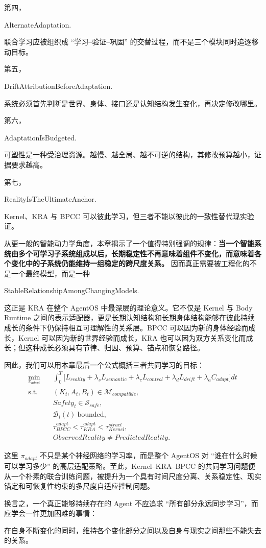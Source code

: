 第四，
\begin{statementbox}
AlternateAdaptation.
\end{statementbox}
联合学习应被组织成 ``学习--验证--巩固'' 的交替过程，而不是三个模块同时追逐移动目标。

第五，
\begin{statementbox}
DriftAttributionBeforeAdaptation.
\end{statementbox}
系统必须首先判断是世界、身体、接口还是认知结构发生变化，再决定修改哪里。

第六，
\begin{statementbox}
AdaptationIsBudgeted.
\end{statementbox}
可塑性是一种受治理资源。越慢、越全局、越不可逆的结构，其修改预算越小，证据要求越高。

第七，
\begin{statementbox}
RealityIsTheUltimateAnchor.
\end{statementbox}
Kernel、KRA 与 BPCC 可以彼此学习，但三者不能以彼此的一致性替代现实验证。

从更一般的智能动力学角度，本章揭示了一个值得特别强调的规律：\textbf{当一个智能系统由多个可学习子系统组成以后，长期稳定性不再意味着组件不变化，而意味着各个变化中的子系统仍能维持一组稳定的跨尺度关系。} 因而真正需要被工程化的不是一个最终模型，而是一种
\begin{statementbox}
StableRelationshipAmongChangingModels.
\end{statementbox}

这正是 KRA 在整个 AgentOS 中最深层的理论意义。它不仅是 Kernel 与 Body Runtime 之间的表示适配器，更是长期认知结构和长期身体结构能够在彼此持续成长的条件下仍保持相互可理解性的关系层。BPCC 可以因为新的身体经验而成长，Kernel 可以因为新的世界经验而成长，KRA 也可以因为双方关系变化而成长；但这种成长必须具有节律、归因、预算、锚点和恢复路径。

因此，我们可以用本章最后一个公式概括三者共同学习的目标：
\[
\boxed{
\begin{aligned}
\min_{\pi_{adapt}}
\quad&
\int_{0}^{T}
\Big[
L_{reality}
+
\lambda_s L_{semantic}
+
\lambda_c L_{control}
+
\lambda_d L_{drift}
+
\lambda_a C_{adapt}
\Big]dt
\\
\text{s.t.}\quad&
(K_t,A_t,B_t)\in\mathcal M_{compatible},
\\
&
Safety_t\in\mathcal S_{safe},
\\
&
\mathcal B_i(t)\ \text{bounded},
\\
&
\tau_{BPCC}^{adapt}
<
\tau_{KRA}^{adapt}
<
\tau_{Kernel}^{struct},
\\
&
ObservedReality
\neq
PredictedReality.
\end{aligned}
}
\]

这里 $\pi_{adapt}$ 不只是某个神经网络的学习率，而是整个 AgentOS 对 ``谁在什么时候可以学习多少'' 的高层适配策略。至此，Kernel--KRA--BPCC 的共同学习问题便从一个朴素的联合训练问题，被提升为一个具有时间尺度分离、关系稳定性、现实锚定和可恢复性约束的多尺度自适应控制问题。

换言之，一个真正能够持续存在的 Agent 不应追求 ``所有部分永远同步学习''，而应学会一件更加困难的事情：

\begin{statementbox}
在自身不断变化的同时，维持各个变化部分之间以及自身与现实之间那些不能失去的关系。
\end{statementbox}
